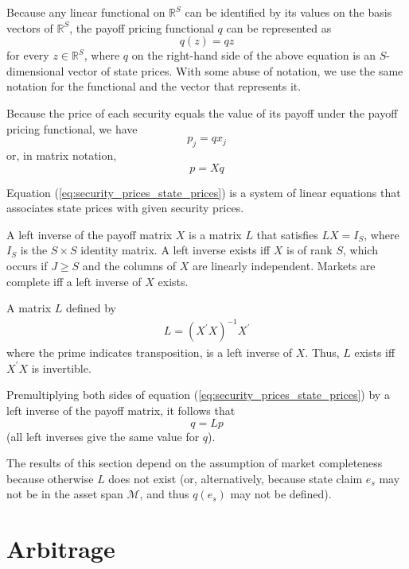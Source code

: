 \documentclass[\topdir/lecture\_notes.tex]{subfiles}
\begin{document}
Because any linear functional on $\mathbb{R}^{S}$ can be identified by its values on the basis vectors of $\mathbb{R}^{S}$, the payoff pricing functional $q$ can be represented as
\begin{equation*}
q(z)=q z
\end{equation*}
for every $z \in \mathbb{R}^{S}$, where $q$ on the right-hand side of the above equation is an $S$-dimensional vector of state prices. With some abuse of notation, we use the same notation for the functional and the vector that represents it.

Because the price of each security equals the value of its payoff under the payoff pricing functional, we have
\begin{equation*}
p_{j}=q x_{j}
\end{equation*}
or, in matrix notation,
\begin{equation}
p=X q \label{eq:security_prices_state_prices}
\end{equation}

Equation (\ref{eq:security_prices_state_prices}) is a system of linear equations that associates state prices with given security prices.

A left inverse of the payoff matrix $X$ is a matrix $L$ that satisfies $L X=I_{S}$, where $I_{S}$ is the $S \times S$ identity matrix. A left inverse exists iff $X$ is of rank $S$, which occurs if $J \geq S$ and the columns of $X$ are linearly independent. Markets are complete iff a left inverse of $X$ exists.

A matrix $L$ defined by
\begin{align*}
L=\left(X^{\prime} X\right)^{-1} X^{\prime} 
\end{align*}
where the prime indicates transposition, is a left inverse of $X$. Thus, $L$ exists iff $X^{\prime} X$ is invertible.

Premultiplying both sides of equation (\ref{eq:security_prices_state_prices}) by a left inverse of the payoff matrix, it follows that
\begin{equation*}
q=L p
\end{equation*}
(all left inverses give the same value for $q$).

The results of this section depend on the assumption of market completeness because otherwise $L$ does not exist (or, alternatively, because state claim $e_{s}$ may not be in the asset span $\mathcal{M}$, and thus $q(e_{s})$ may not be defined).

\section{Arbitrage}
\end{document}
